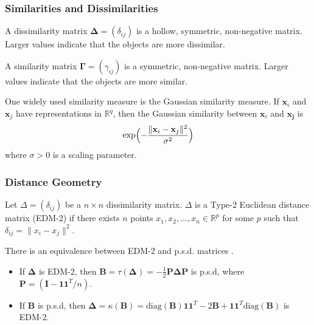 \documentclass[professionalfonts, hyperref={pdfpagelabels=false,
  colorlinks=true, linkcolor=purple}]{beamer}
\begin{document}
\begin{frame}
  \frametitle{Similarities and Dissimilarities}
  A \alert{dissimilarity matrix} $\bm{\Delta} = (\delta_{ij})$
  is a hollow, symmetric, non-negative matrix. Larger values indicate
  that the objects are more dissimilar. 

  \vskip10pt A \alert{similarity matrix} $\bm{\Gamma} =
  (\gamma_{ij})$ is a symmetric, non-negative matrix. Larger values
  indicate that the objects are more similar. 

  \vskip10pt One widely used similarity measure is the Gaussian
  similarity measure. If $\mathbf{x}_i$ and $\mathbf{x}_j$ have representations
  in $\mathbb{R}^{q}$, then the Gaussian similarity between
  $\mathbf{x}_i$ and $\mathbf{x_j}$ is
  \begin{equation}
    \label{eq:3}
    \exp\Bigl(- \frac{\| \mathbf{x}_i - \mathbf{x}_j \|^{2}}{\sigma^2}\Bigr)
  \end{equation}
  where $\sigma > 0$ is a scaling parameter.
\end{frame}

\begin{frame}
  \frametitle{Distance Geometry}
  \begin{definition}
    \label{def:2}
    Let $\Delta = (\delta_{ij})$ be a $n \times n$ dissimilarity
    matrix. $\Delta$ is a Type-2 Euclidean distance matrix
    (\alert{EDM-2}) if there exists $n$ points $x_1, x_2, \dots, x_n
    \in \mathbb{R}^{p}$ for some $p$ such that $\delta_{ij} = \| x_i -
    x_j \|^2$.
  \end{definition}
  \vskip10pt There is an equivalence between EDM-2 and p.s.d. matrices
  \cite{schoenberg38:_metric}.
 \begin{itemize}
 \item If $\bm{\Delta}$ is EDM-2, then $\mathbf{B} = \tau(\bm{\Delta})
   = - \frac{1}{2} \mathbf{P} \bm{\Delta} \mathbf{P}$ is p.s.d, where
   $\mathbf{P} = (\mathbf{I} - \bm{1}\bm{1}^{T}/n)$.
 \item If $\bm{B}$ is p.s.d, then $\bm{\Delta} = \kappa(\mathbf{B}) =
   \mathrm{diag}(\mathbf{B})\bm{1}\bm{1}^{T} - 2\mathbf{B} +
   \bm{1}\bm{1}^{T}\mathrm{diag}(\mathbf{B})$ is EDM-2.
 \end{itemize}
\end{frame}
\end{document}
